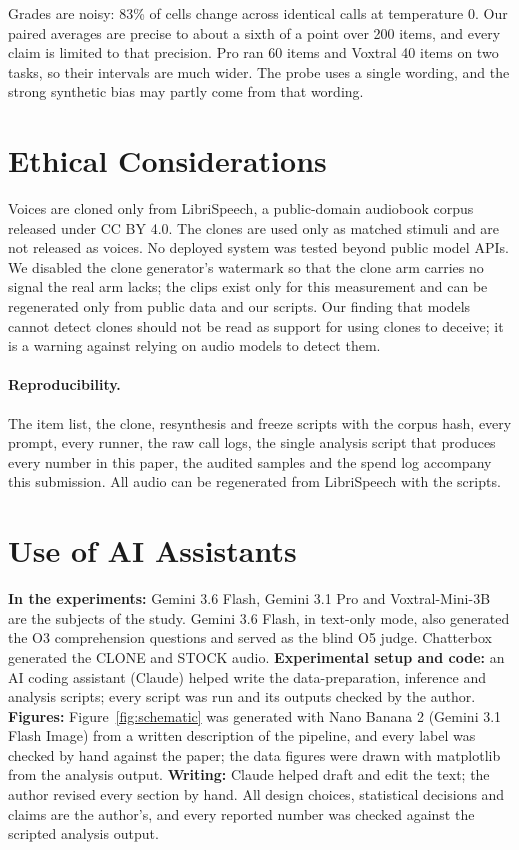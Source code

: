 Grades are noisy: 83\% of cells change across identical calls at temperature 0. Our paired averages are precise to about a sixth of a point over 200 items, and every claim is limited to that precision. Pro ran 60 items and Voxtral 40 items on two tasks, so their intervals are much wider. The probe uses a single wording, and the strong synthetic bias may partly come from that wording.

\section*{Ethical Considerations}
Voices are cloned only from LibriSpeech, a public-domain audiobook corpus released under CC BY 4.0. The clones are used only as matched stimuli and are not released as voices. No deployed system was tested beyond public model APIs. We disabled the clone generator's watermark so that the clone arm carries no signal the real arm lacks; the clips exist only for this measurement and can be regenerated only from public data and our scripts. Our finding that models cannot detect clones should not be read as support for using clones to deceive; it is a warning against relying on audio models to detect them.

\paragraph{Reproducibility.}
The item list, the clone, resynthesis and freeze scripts with the corpus hash, every prompt, every runner, the raw call logs, the single analysis script that produces every number in this paper, the audited samples and the spend log accompany this submission. All audio can be regenerated from LibriSpeech with the scripts.

\section*{Use of AI Assistants}
\textbf{In the experiments:} Gemini 3.6 Flash, Gemini 3.1 Pro and Voxtral-Mini-3B are the subjects of the study. Gemini 3.6 Flash, in text-only mode, also generated the O3 comprehension questions and served as the blind O5 judge. Chatterbox generated the CLONE and STOCK audio. \textbf{Experimental setup and code:} an AI coding assistant (Claude) helped write the data-preparation, inference and analysis scripts; every script was run and its outputs checked by the author. \textbf{Figures:} Figure~\ref{fig:schematic} was generated with Nano Banana 2 (Gemini 3.1 Flash Image) from a written description of the pipeline, and every label was checked by hand against the paper; the data figures were drawn with matplotlib from the analysis output. \textbf{Writing:} Claude helped draft and edit the text; the author revised every section by hand. All design choices, statistical decisions and claims are the author's, and every reported number was checked against the scripted analysis output.
